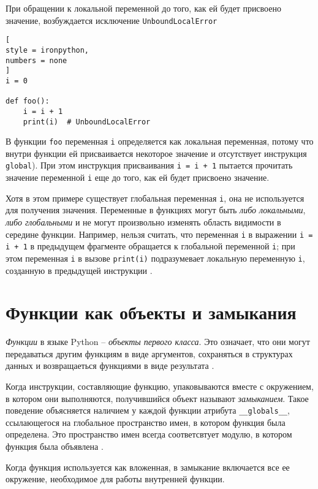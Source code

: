 \documentclass[%
	11pt,
	a4paper,
	utf8,
		]{article}
\begin{document}
При обращении к локальной переменной до того, как ей будет присвоено значение, возбуждается исключение \texttt{UnboundLocalError}
\begin{lstlisting}[
style = ironpython,
numbers = none	
]
i = 0

def foo():
    i = i + 1
    print(i)  # UnboundLocalError
\end{lstlisting}

В функции \texttt{foo} переменная \texttt{i} определяется как локальная переменная, потому что внутри функции ей присваивается некоторое значение и отсутствует инструкция \texttt{global}). При этом инструкция присваивания \texttt{i = i + 1} пытается прочитать значение переменной \texttt{i} еще до того, как ей будет присвоено значение. 

Хотя в этом примере существует глобальная переменная \texttt{i}, она не используется для получения значения. Переменные в функциях могут быть \emph{либо локальными}, \emph{либо глобальными} и не могут произвольно изменять область видимости в середине функции. Например, нельзя считать, что переменная \texttt{i} в выражении \texttt{i = i + 1} в предыдущем фрагменте обращается к глобальной переменной \texttt{i}; при этом переменная \texttt{i} в вызове \texttt{print(i)} подразумевает локальную переменную \texttt{i}, созданную в предыдущей инструкции \cite[]{beazley:python-2010}.

\section{Функции как объекты и замыкания}

\emph{Функции} в языке Python -- \emph{объекты первого класса}. Это означает, что они могут передаваться другим функциям в виде аргументов, сохраняться в структурах данных и возвращаеться функциями в виде результата \cite[]{beazley:python-2010}.

Когда инструкции, составляющие функцию, упаковываются вместе с окружением, в котором они выполняются, получившийся объект называют \emph{замыканием}. Такое поведение объясняется наличием у каждой функции атрибута \verb|__globals__|, ссылающегося на глобальное пространство имен, в котором функция была определена. Это пространство имен всегда соответсвтует модулю, в котором функция была объявлена \cite[]{beazley:python-2010}.

Когда функция используется как вложенная, в замыкание включается все ее окружение, необходимое для работы внутренней функции.
\end{document}
